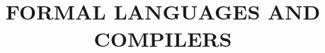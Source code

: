 \documentclass[a4paper, 9pt]{article}
\title{FORMAL LANGUAGES AND COMPILERS}
\begin{document}
    \maketitle
    \tableofcontents{}
    \newpage
    
\end{document}
